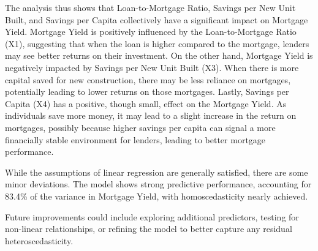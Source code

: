 \documentclass[
  11pt,
]{article}
\begin{document}
The analysis thus shows that Loan-to-Mortgage Ratio, Savings per New
Unit Built, and Savings per Capita collectively have a significant
impact on Mortgage Yield. Mortgage Yield is positively influenced by the
Loan-to-Mortgage Ratio (X1), suggesting that when the loan is higher
compared to the mortgage, lenders may see better returns on their
investment. On the other hand, Mortgage Yield is negatively impacted by
Savings per New Unit Built (X3). When there is more capital saved for
new construction, there may be less reliance on mortgages, potentially
leading to lower returns on those mortgages. Lastly, Savings per Capita
(X4) has a positive, though small, effect on the Mortgage Yield. As
individuals save more money, it may lead to a slight increase in the
return on mortgages, possibly because higher savings per capita can
signal a more financially stable environment for lenders, leading to
better mortgage performance.

While the assumptions of linear regression are generally satisfied,
there are some minor deviations. The model shows strong predictive
performance, accounting for 83.4\% of the variance in Mortgage Yield,
with homoscedasticity nearly achieved.

Future improvements could include exploring additional predictors,
testing for non-linear relationships, or refining the model to better
capture any residual heteroscedasticity.
\end{document}
